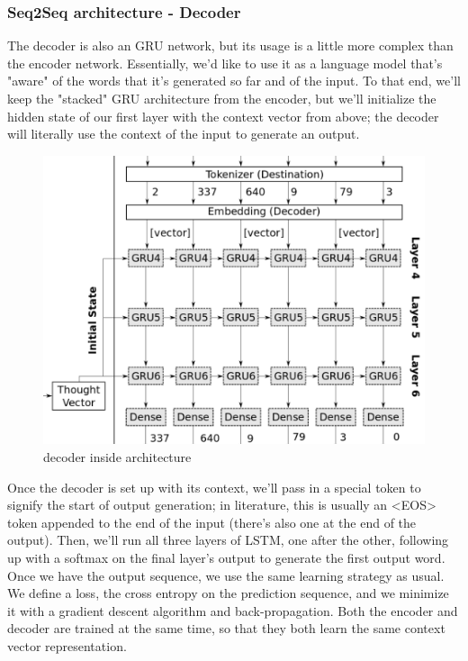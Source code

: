 \subsubsection{Seq2Seq architecture - Decoder}
The decoder is also an GRU network, but its usage is a little more complex than the encoder network. Essentially, we’d like to use it as a language model that’s "aware" of the words that it’s generated
so far and of the input. To that end, we’ll keep the "stacked" GRU
architecture from the encoder, but we’ll initialize the hidden state of
our first layer with the context vector from above; the decoder will
literally use the context of the input to generate an output.
\begin{figure}[H]%
    \center%
    \includegraphics[width=.8\textwidth]{images/amir/dec.png}%
    \caption[This is a decoder image]{ decoder inside architecture \cite{web018}
    }\label{fig:decoder}%
  \end{figure}
Once the decoder is set up with its context, we’ll pass in a special
token to signify the start of output generation; in literature, this is
usually an <EOS> token appended to the end of the input (there’s
also one at the end of the output).
Then, we’ll run all three layers of
LSTM, one after the other, following up with a softmax on the final
layer’s output to generate the first output word.\\
Once we have the output sequence, we use the same learning strategy
as usual. We define a loss, the cross entropy on the prediction
sequence, and we minimize it with a gradient descent algorithm and
back-propagation. Both the encoder and decoder are trained at the
same time, so that they both learn the same context vector representation.
